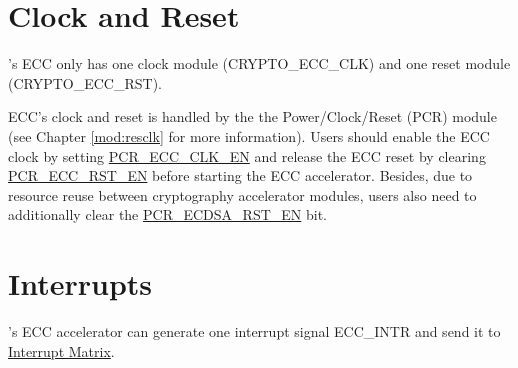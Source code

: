\documentclass[main\_\_EN.tex]{subfiles}
\begin{document}

\section{Clock and Reset}
\label{sec:ecc-clkrst}

\chipname{}'s ECC only has one clock module (CRYPTO\_ECC\_CLK) and one reset module (CRYPTO\_ECC\_RST).

ECC's clock and reset is handled by the the Power/Clock/Reset (PCR) module (see Chapter \ref{mod:resclk} \textit{} for more information). Users should enable the ECC clock by setting \hyperref[fielddesc:PCRECCCLKEN]{PCR\_ECC\_CLK\_EN} and release the ECC reset by clearing \hyperref[fielddesc:PCRECCRSTEN]{PCR\_ECC\_RST\_EN} before starting the ECC accelerator. Besides, due to resource reuse between cryptography accelerator modules, users also need to additionally clear the \hyperref[fielddesc:PCRECDSARSTEN]{PCR\_ECDSA\_RST\_EN} bit.

\section{Interrupts}
\label{sec:ecc-interrupt}

\chipname{}'s ECC accelerator can generate one interrupt signal ECC\_INTR and send it to \hyperref[mod:intmtrx]{Interrupt Matrix}.
\end{document}
